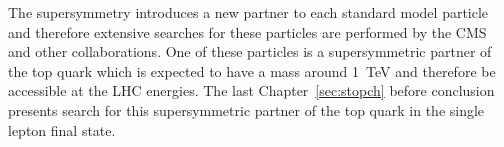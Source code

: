 The supersymmetry introduces a new partner to each standard model particle and therefore extensive searches for these particles are performed by the CMS and other collaborations. One of these particles is a supersymmetric partner of the top quark which is expected to have a mass around 1~TeV and therefore be accessible at the LHC energies. The last Chapter~\ref{sec:stopch} before conclusion presents search for this supersymmetric partner of the top quark in the single lepton final state.





